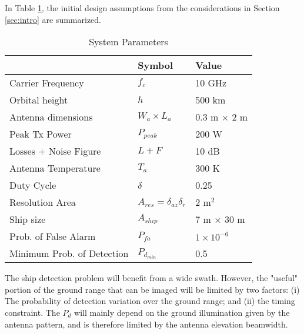 \documentclass[conference,a4paper]{IEEEtran}
\begin{document}
    In Table \ref{tab:parameters}, the initial design assumptions from the considerations in Section \ref{sec:intro} are summarized.
    \begin{table}[h]
        \caption{System Parameters}
        \label{tab:parameters}
        \centering
        \begin{tabular}{|l|l|l|}
            \hline
            & \textbf{Symbol}                       & \textbf{Value}     \\ \hline
            Carrier Frequency          & $f_c$                                 & 10 GHz             \\ \hline
            Orbital height             & $h$                                   & 500 km             \\ \hline
            Antenna dimensions         & $W_a \times L_a$                      & 0.3 m $\times$ 2 m \\ \hline
            Peak Tx Power              & $P_{peak}$                            & 200 W              \\ \hline
            Losses + Noise Figure      & $L+F$                                 & 10 dB              \\ \hline
            Antenna Temperature        & $T_a$                                 & 300 K              \\ \hline
            Duty Cycle                 & $\delta$                              & 0.25               \\ \hline
            Resolution Area            & $A_{res}=\delta_{az}\delta_{r}$       & 2 m$^2$            \\ \hline
            Ship size                  & $A_{ship}$                            & 7 m $\times$ 30 m  \\ \hline
            Prob. of False Alarm       & $P_{fa}$                              & $1\times 10^{-6}$  \\ \hline
            Minimum Prob. of Detection & $P_{d_{min}}$ \rule[-1.1mm]{0mm}{1mm} & 0.5                \\ \hline
        \end{tabular}
    \end{table}
    The ship detection problem will benefit from a wide swath.
    However, the "useful" portion of the ground range that can be imaged will be limited by two factors: (i) The probability of detection variation over the ground range;
    and (ii) the timing constraint.
    The $P_d$ will mainly depend on the ground illumination given by the antenna pattern, and is therefore limited by the antenna elevation beamwidth.
\end{document}
